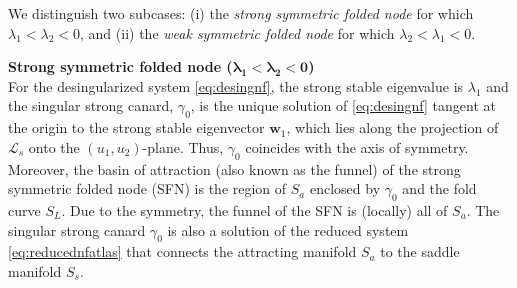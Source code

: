 \documentclass[10pt,onecolumn]{article}
\theoremstyle{plain}
\begin{document}
We distinguish two subcases: (i) the {\em strong symmetric folded node} for which $\lambda_1<\lambda_2<0$, and (ii) the {\em weak symmetric folded node} for which $\lambda_2<\lambda_1<0$. 

\medskip \textbf{Strong symmetric folded node ($\boldsymbol{\lambda_1<\lambda_2<0}$)} \medskip \\
For the desingularized system \eqref{eq:desingnf}, the strong stable eigenvalue is $\lambda_1$ and the singular strong canard, $\gamma_0$, is the unique solution of \eqref{eq:desingnf} tangent at the origin to the strong stable eigenvector $\boldsymbol w_1$, which lies along the projection of $\mathcal L_s$ onto the $(u_1,u_2)$-plane.
Thus, $\gamma_0$ coincides with the axis of symmetry. Moreover, the basin of attraction (also known as the funnel) of the strong symmetric folded node (SFN) is the region of $S_a$ enclosed by $\gamma_0$ and the fold curve $S_L$. 
Due to the symmetry, the funnel of the SFN is (locally) all of $S_a$.
The singular strong canard $\gamma_0$ is also a solution of the reduced system \eqref{eq:reducednfatlas} that connects the attracting manifold $S_a$ to the  saddle manifold $S_s$. 
\end{document}
